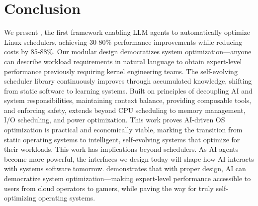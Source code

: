 \section{Conclusion}

We present \sys, the first framework enabling LLM agents to automatically optimize Linux schedulers, achieving 30-80\% performance improvements while reducing costs by 85-88\%. Our modular design democratizes system optimization—anyone can describe workload requirements in natural language to obtain expert-level performance previously requiring kernel engineering teams. The self-evolving scheduler library continuously improves through accumulated knowledge, shifting from static software to learning systems. Built on principles of decoupling AI and system responsibilities, maintaining context balance, providing composable tools, and enforcing safety, \sys extends beyond CPU scheduling to memory management, I/O scheduling, and power optimization. This work proves AI-driven OS optimization is practical and economically viable, marking the transition from static operating systems to intelligent, self-evolving systems that optimize for their workloads. This work has implications beyond schedulers. As AI agents become more powerful, the interfaces we design today will shape how AI interacts with systems software tomorrow. \sys demonstrates that with proper design, AI can democratize system optimization—making expert-level performance accessible to users from cloud operators to gamers, while paving the way for truly self-optimizing operating systems.